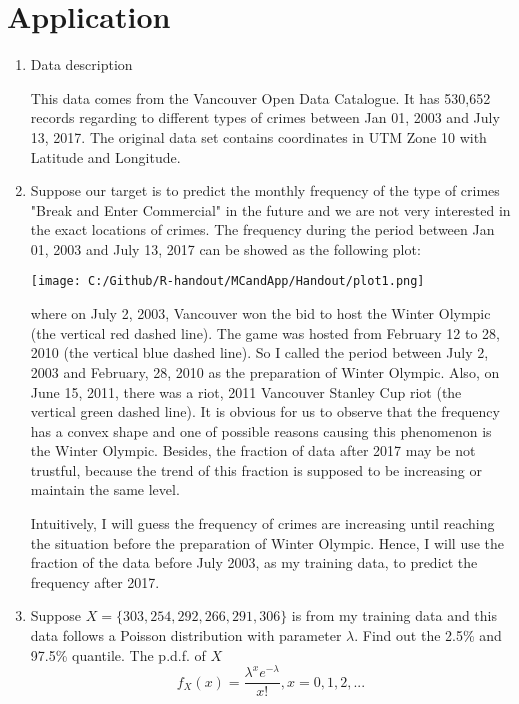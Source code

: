 \section{Application}
\begin{enumerate}
	\item Data description\cite{civ17}
	\par This data comes from the Vancouver Open Data Catalogue. It has 530,652 records regarding to different types of crimes between Jan 01, 2003 and July 13, 2017. The original data set contains coordinates in UTM Zone 10 with Latitude and Longitude. 
	\item Suppose our target is to predict the monthly frequency of the type of crimes "Break and Enter Commercial" in the future and we are not very interested in the exact locations of crimes. The frequency during the period between Jan 01, 2003 and July 13, 2017 can be showed as the following plot:
	\begin{center}
		\texttt{[image: C:/Github/R-handout/MCandApp/Handout/plot1.png]}
	\end{center}
	where on July 2, 2003, Vancouver won the bid to host the Winter Olympic (the vertical red dashed line). The game was hosted from February 12 to 28, 2010 (the vertical blue dashed line). So I called the period between July 2, 2003 and February, 28, 2010 as the preparation of Winter Olympic. Also, on June 15, 2011, there was a riot, 2011 Vancouver Stanley Cup riot (the vertical green dashed line). It is obvious for us to observe that the frequency has a convex shape and one of possible reasons causing this phenomenon is the Winter Olympic. Besides, the fraction of data after 2017 may be not trustful, because the trend of this fraction is supposed to be increasing or maintain the same level.
	\par Intuitively, I will guess the frequency of crimes are increasing until reaching the situation before the preparation of Winter Olympic. Hence, I will use the fraction of the data before July 2003, as my training data, to predict the frequency after 2017.
	\item
	\par Suppose $X = \{303, 254, 292, 266, 291, 306\}$ is from my training data and this data follows a Poisson distribution with parameter $\lambda$. Find out the 2.5\% and 97.5\% quantile. The p.d.f. of $X$
	\begin{equation*}
		f_X(x) = \frac{\lambda^{x}e^{-\lambda}}{x!} , x = 0, 1, 2, ...
	\end{equation*}

\end{enumerate}
